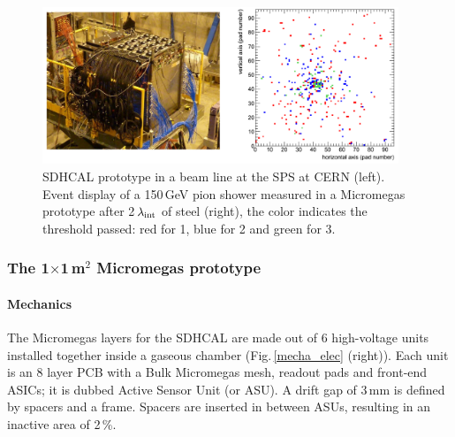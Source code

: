 \begin{figure}
\begin{centering}
\includegraphics[width=0.95\textwidth]{Calorimeter/SDHCAL/test}
\caption{SDHCAL prototype in a beam line at the SPS at CERN (left). Event display of a 150\,GeV pion shower measured in a Micromegas prototype after 2\,$\lambda_{\rm int}$ of steel (right), the color indicates the threshold passed: red for 1, blue for 2 and green for 3.}
\label{sdhcal}
\end{centering}
\end{figure}


\subsubsection{The 1$\times$1\,m$^{2}$ Micromegas prototype}

\paragraph{Mechanics}
The Micromegas layers for the SDHCAL are made out of 6 high-voltage units installed together inside a gaseous chamber (Fig.\,\ref{mecha_elec} (right)). Each unit is an 8 layer PCB with a Bulk Micromegas mesh, readout pads and front-end ASICs; it is dubbed Active Sensor Unit (or ASU). A drift gap of 3\,mm is defined by spacers and a frame. Spacers are inserted in between ASUs, resulting in an inactive area of 2\,\%.


